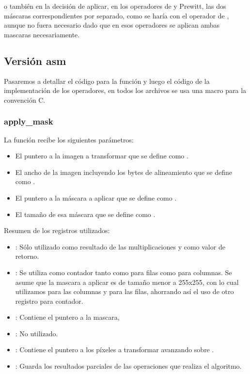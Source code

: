 o tambi\'en en la decisi\'on de aplicar, en los operadores de  y Prewitt, las dos m\'ascaras correspondientes 
por separado, como se har\'ia con el operador de , aunque no fuera necesario dado que en esos operadores se 
aplican ambas mascaras necesariamente.

\vspace{1cm}
\subsection{Versi\'on asm}
Pasaremos a detallar el c\'odigo para la funci\'on  y luego el c\'odigo de la implementaci\'on de los 
operadores, en todos los archivos se usa una macro para la convenci\'on C.

\pagebreak

\subsubsection{apply\_mask}
La funci\'on recibe los siguientes par\'ametros:
\begin{itemize}
	\item El puntero a la imagen a transformar que se define como .
	\item El ancho de la imagen incluyendo los bytes de alineamiento que se define como .
	\item El puntero a la m\'ascara a aplicar que se define como .
	\item El tamaño de esa m\'ascara que se define como .
\end{itemize}

Resumen de los registros utilizados:
\begin{itemize}
	\item{}: S\'olo utilizado como resultado de las multiplicaciones y como valor de retorno.
	\item{}: Se utiliza como contador tanto como para filas como para columnas. Se asume que la mascara a 
aplicar es de tamaño menor a 255x255, con lo cual utilizamos  para las columnas y  para las filas, 
ahorrando as\'i el uso de otro registro para contador.
	\item{}: Contiene el puntero a la mascara, 
	\item{}: No utilizado.
	\item{}: Contiene el puntero a los p\'ixeles a transformar avanzando sobre .
	\item{}: Guarda los resultados parciales de las operaciones que realiza el algoritmo.
\end{itemize}

